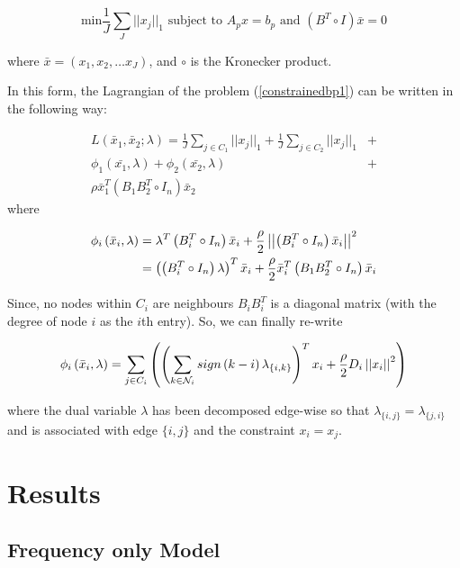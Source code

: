 \documentclass{article}
\begin{document}
\begin{equation}
\text{min} \frac{1}{J}\sum_J||x_j||_1 \text{ subject to } A_p x = b_p \text{ and } \left(B^T \circ I \right)\bar{x} = 0 
 \label{constrainedbp1}
\end{equation}

where \(\bar{x} = \left(x_1, x_2, \ldots x_J \right)\), and \(\circ\) is the Kronecker product. 

In this form, the Lagrangian of the problem (\ref{constrainedbp1}) can be written in the following way:

\begin{align}
L\left(\bar{x}_1, \bar{x}_2; \lambda\right) = \frac{1}{J}\sum_{j \in C_1}||x_j||_1 + \frac{1}{J}\sum_{j \in C_2}||x_j||_1 &+ \\ \phi_1\left(\bar{x_1}, \lambda\right) + \phi_2\left(\bar{x_2}, \lambda\right) &+ \\
\rho\bar{x}_1^T\left(B_1B_2^T\circ I_n\right)\bar{x}_2
\end{align}
where 

\begin{align}
\phi_i\left(\bar{x}_i, \lambda\right) &= \lambda^T\left(B_i^T\circ I_n\right)\bar{x}_i + \frac{\rho}{2}\left|\left|\left(B_i^T\circ I_n\right)\bar{x}_i \right|\right|^2 \\
&= \left(\left(B_i^T\circ I_n\right)\lambda \right)^T\bar{x}_i + \frac{\rho}{2}\bar{x}_i^T\left(B_1B_2^T\circ I_n\right)\bar{x}_i
\end{align}

Since, no nodes within \(C_i\) are neighbours \(B_iB_i^T\) is a diagonal matrix (with the degree of node \(i\) as the \(i\)th entry). So, we can finally re-write

\begin{equation}
\phi_i\left(\bar{x}_i, \lambda\right) = \sum_{j \in C_i}\left(\left(\sum_{k \in \mathcal{N}_i} sign\left(k-i\right)\lambda_{\{i,k\}}\right)^T x_i + \frac{\rho}{2}D_i\left|\left|x_i\right|\right|^2  \right)
\end{equation}

where the dual variable \(\lambda\) has been decomposed edge-wise so that \(\lambda_{\{i,j\}} = \lambda_{\{j,i\}}\) and is associated with edge \(\{i,j\}\) and the constraint \(x_i = x_j\).

\section{Results}

\subsection{Frequency only Model}
\end{document}
